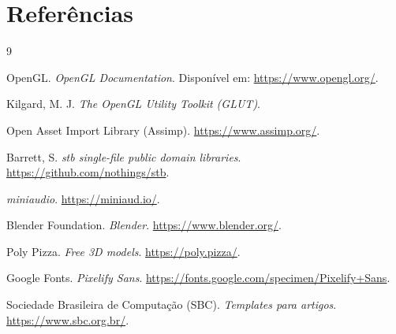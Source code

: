 \documentclass[12pt]{article}
\begin{document}
\section*{Referências}
\begin{thebibliography}{9}

 OpenGL. \emph{OpenGL Documentation}.
  Disponível em: \url{https://www.opengl.org/}.

 Kilgard, M. J. \emph{The OpenGL Utility Toolkit (GLUT)}.

 Open Asset Import Library (Assimp).
  \url{https://www.assimp.org/}.

 Barrett, S. \emph{stb single-file public domain libraries}.
  \url{https://github.com/nothings/stb}.

 \emph{miniaudio}. \url{https://miniaud.io/}.

 Blender Foundation. \emph{Blender}.
  \url{https://www.blender.org/}.

 Poly Pizza. \emph{Free 3D models}.
  \url{https://poly.pizza/}.

 Google Fonts. \emph{Pixelify Sans}.
  \url{https://fonts.google.com/specimen/Pixelify+Sans}.

 Sociedade Brasileira de Computação (SBC).
  \emph{Templates para artigos}. \url{https://www.sbc.org.br/}.

\end{thebibliography}
\end{document}

